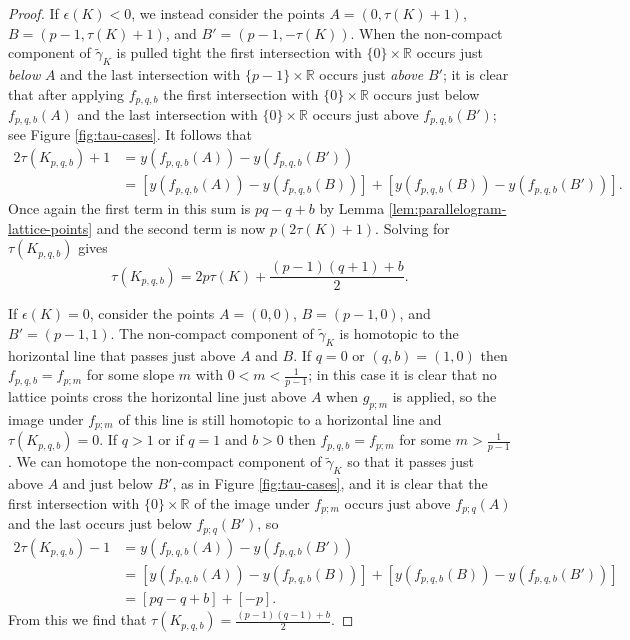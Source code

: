 \documentclass{amsart}
\newcommand{\R}{\mathbb{R}}
\theoremstyle{definition}
\theoremstyle{remark}
\numberwithin{equation}{section}
\numberwithin{equation}{section} \makeatletter
\begin{document}
\begin{proof}
If $\epsilon(K) < 0$, we instead consider the points $A = (0, \tau(K)+1)$, $B = (p-1, \tau(K)+1)$, and $B' = (p-1, -\tau(K))$. When the non-compact component of $\tilde \gamma_K$ is pulled tight the first intersection with $\{0\}\times\R$ occurs just \emph{below} $A$ and the last intersection with $\{p-1\}\times \R$ occurs just \emph{above} $B'$; it is clear that after applying $f_{p,q,b}$ the first intersection with $\{0\}\times\R$ occurs just below $f_{p,q,b}(A)$ and the last intersection with $\{0\}\times\R$ occurs just above $f_{p,q,b}(B')$; see Figure \ref{fig:tau-cases}. It follows that
\begin{align*}
2\tau(K_{p,q,b}) + 1 &= y( f_{p,q,b}(A) ) - y( f_{p,q,b}(B') )  \\
&= \left[ y( f_{p,q,b}(A) ) - y( f_{p,q,b}(B) ) \right] + \left[ y( f_{p,q,b}(B) ) - y( f_{p,q,b}(B') )  \right].
\end{align*}
Once again the first term in this sum is $pq - q + b$ by Lemma \ref{lem:parallelogram-lattice-points} and the second term is now $p(2\tau(K)+1)$. Solving for $\tau(K_{p,q,b})$ gives
$$\tau(K_{p,q,b}) = 2 p \tau(K) + \frac{(p-1)(q+1)+b}{2}.$$

If $\epsilon(K) = 0$, consider the points $A = (0, 0)$, $B = (p-1, 0)$, and $B' = (p-1,1)$. The non-compact component of $\tilde \gamma_K$ is homotopic to the horizontal line that passes just above $A$ and $B$. If $q = 0$ or $(q,b) = (1,0)$ then $f_{p,q,b} = f_{p;m}$ for some slope $m$ with $0 < m < \frac{1}{p-1}$; in this case it is clear that no lattice points cross the horizontal line just above $A$ when $g_{p;m}$ is applied, so the image under $f_{p;m}$ of this line is still homotopic to a horizontal line and $\tau(K_{p,q,b}) = 0$. If $q > 1$ or if $q =1$ and $b>0$ then $f_{p,q,b} = f_{p;m}$ for some $m > \frac{1}{p-1}$. We can homotope the non-compact component of $\tilde \gamma_K$ so that it passes just above $A$ and just below $B'$, as in Figure \ref{fig:tau-cases}, and it is clear that the first intersection with $\{0\}\times \R$ of the image under $f_{p;m}$ occurs just above $f_{p;q}(A)$ and the last occurs just below $f_{p;q}(B')$, so 
\begin{align*}
2\tau(K_{p,q,b}) - 1 &= y( f_{p,q,b}(A) ) - y( f_{p,q,b}(B') )  \\
&= \left[ y( f_{p,q,b}(A) ) - y( f_{p,q,b}(B) ) \right] + \left[ y( f_{p,q,b}(B) ) - y( f_{p,q,b}(B') )  \right] \\
&= [pq - q + b] + [-p].
\end{align*}
From this we find that $\tau(K_{p,q,b}) = \frac{(p-1)(q-1) + b}{2}$.


\end{proof}
\end{document}
